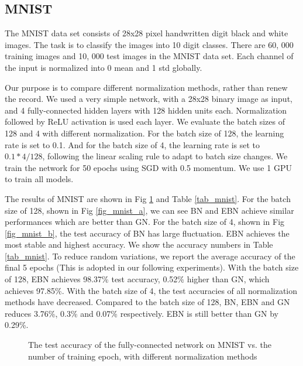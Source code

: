 \documentclass[runningheads]{llncs}
\begin{document}
\subsection{MNIST}
The MNIST \cite{lecun1998gradient} data set consists of 28x28 pixel  handwritten digit black and white images. The task is to classify the images into 10 digit classes. There are  60, 000 training  images and 10, 000 test images in the MNIST data set. Each channel of the input is normalized into 0 mean and 1 std globally. 


Our purpose is to compare different normalization methods, rather than renew the record. We used a very simple network, with a 28x28 binary image as input, and 4 fully-connected hidden layers with 128 hidden units each. Normalization followed by ReLU activation is used each layer. 
We evaluate the batch sizes of 128 and 4 with different normalization. For the batch size of 128, the learning rate is set to 0.1. And for the batch size of 4, the learning rate is set to $0.1*4/128$, following the linear scaling rule \cite{goyal2017accurate} to adapt to batch size changes. We train the network for 50 epochs using SGD with 0.5 momentum. We use 1 GPU to train all models.

The results of MNIST are shown in Fig \ref{fig_mnist}  and Table \ref{tab_mnist}. For the batch size of 128, shown in Fig \ref{fig_mnist_a}, we can see BN and EBN achieve similar performances which are better than GN. For the batch size of 4, shown in Fig \ref{fig_mnist_b}, the test accuracy of BN has large fluctuation. EBN achieves the most stable and highest accuracy. We show the accuracy numbers in Table \ref{tab_mnist}. To reduce random variations, we report the average accuracy of the final 5 epochs (This is adopted in our following experiments). With the batch size of 128, EBN achieves 98.37\% test accuracy, 0.52\% higher than GN, which achieves 97.85\%. With the batch size of 4, the test accuracies of all normalization methods have decreased. 
Compared to the batch size of 128, BN, EBN and GN reduces 3.76\%, 0.3\% and 0.07\% respectively. EBN is still better than GN by 0.29\%.  

\begin{figure}[!htb]
\centering
{}
\centering
{}
\caption{The test accuracy of the fully-connected network on MNIST vs. the number of training epoch, with different normalization methods}
\label{fig_mnist}
\end{figure}
\end{document}
